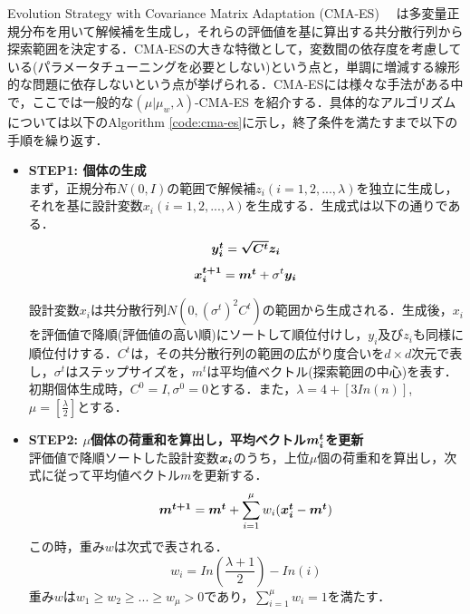 \documentclass[a4j,11pt]{jarticle}
\begin{document}
Evolution Strategy with Covariance Matrix Adaptation (CMA-ES)　\cite{mu-CMA-ES}\cite{CMA-ES} は多変量正規分布を用いて解候補を生成し，それらの評価値を基に算出する共分散行列から探索範囲を決定する．CMA-ESの大きな特徴として，変数間の依存度を考慮している(パラメータチューニングを必要としない)という点と，単調に増減する線形的な問題に依存しないという点が挙げられる．CMA-ESには様々な手法がある中で，ここでは一般的な$(\mu|\mu_w,\lambda)$-CMA-ES \cite{CMA-ES} を紹介する．具体的なアルゴリズムについては以下のAlgorithm \ref{code:cma-es}に示し，終了条件を満たすまで以下の手順を繰り返す．
\begin{itemize}
\item {\bf STEP1: 個体の生成} 　\\
まず，正規分布$N(0,I)$の範囲で解候補$z_i (i=1,2,...,\lambda)$を独立に生成し，それを基に設計変数$x_i (i=1,2,...,\lambda)$を生成する．生成式は以下の通りである．
\begin{equation}
\label{eq:cmaes-yi}
\mbox{\boldmath $y_i^t$}=\mbox{\boldmath $\sqrt{C^t}z_i$}
\end{equation}
\begin{equation}
\label{eq:cmaes-xi}
\mbox{\boldmath $x_i^{t+1}$}=\mbox{\boldmath $m^t$}+ \sigma ^t \mbox{\boldmath $y_i$}
\end{equation}

設計変数$x_i$は共分散行列$N(0,(\sigma^t)^2 C^t)$の範囲から生成される．生成後，$x_i$を評価値で降順(評価値の高い順)にソートして順位付けし，$y_i$及び$z_i$も同様に順位付けする．$C^t$は，その共分散行列の範囲の広がり度合いを$d \times d$次元で表し，$\sigma^t$はステップサイズを，$m^t$は平均値ベクトル(探索範囲の中心)を表す．初期個体生成時，$C^0=I, \sigma^0=0$とする．また，$\lambda=4+[3In(n)]$, $\mu=[\frac{\lambda}{2}]$とする．

\item {\bf STEP2: $\mu$個体の荷重和を算出し，平均ベクトル$\mbox{\boldmath $m_i^t$}$を更新} \\
評価値で降順ソートした設計変数$\mbox{\boldmath $x_i$}$のうち，上位$\mu$個の荷重和を算出し，次式に従って平均値ベクトル$m$を更新する．
\begin{equation}
\label{eq:cmaes-mi}
\mbox{\boldmath $m^{t+1}$}=\mbox{\boldmath $m^t$}+ \sum_{i=1}^{\mu}w_i(\mbox{\boldmath $x_i^t$}-\mbox{\boldmath $m^t$})
\end{equation}
この時，重み$w$は次式で表される．
\begin{equation}
\label{eq:cmaes-w}
w_i=In(\frac{\lambda+1}{2})-In(i)
\end{equation}
重み$w$は$w_1 \geq w_2 \geq ... \geq w_\mu > 0$であり，$\sum_{i=1}^{\mu}w_i=1$を満たす．


\end{itemize}
\end{document}
